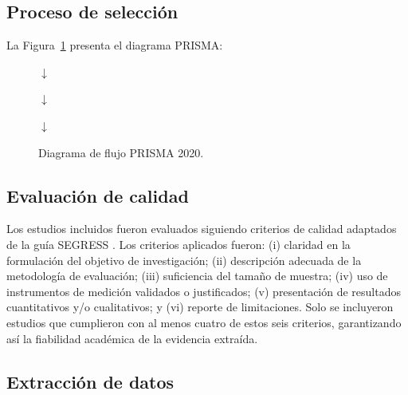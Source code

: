 \documentclass[11pt,twocolumn]{article}
\begin{document}
\subsection{Proceso de selección}

La Figura~\ref{fig:prisma} presenta el diagrama PRISMA:

\begin{figure}[H]
\centering
{}
\vspace{2mm}

{\large$\downarrow$}

\vspace{2mm}

{\large$\downarrow$}

\vspace{2mm}

{\large$\downarrow$}

\caption{Diagrama de flujo PRISMA 2020.}
\label{fig:prisma}
\end{figure}

\subsection{Evaluación de calidad}

Los estudios incluidos fueron evaluados siguiendo criterios de calidad adaptados de la guía SEGRESS \cite{segress2023}. Los criterios aplicados fueron: (i) claridad en la formulación del objetivo de investigación; (ii) descripción adecuada de la metodología de evaluación; (iii) suficiencia del tamaño de muestra; (iv) uso de instrumentos de medición validados o justificados; (v) presentación de resultados cuantitativos y/o cualitativos; y (vi) reporte de limitaciones. Solo se incluyeron estudios que cumplieron con al menos cuatro de estos seis criterios, garantizando así la fiabilidad académica de la evidencia extraída.

\subsection{Extracción de datos}
\end{document}
